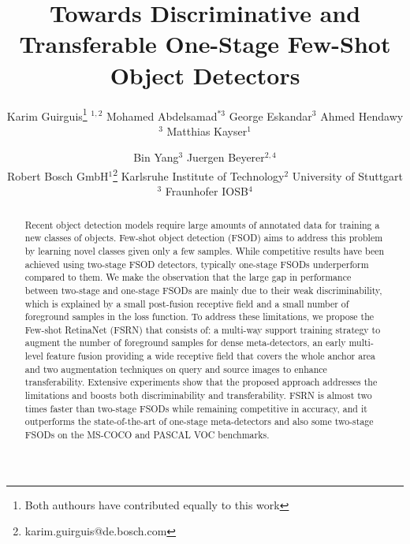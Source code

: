 \documentclass[10pt,twocolumn,letterpaper]{article}
\begin{document}
\title{Towards Discriminative and Transferable One-Stage Few-Shot Object Detectors\vspace{-1em}}





\author{
Karim Guirguis\thanks{Both authours have contributed equally to this work} $^{ 1,2}$\hspace{1mm}
Mohamed Abdelsamad$^{*3}$\hspace{1mm}
George Eskandar$^{3}$\hspace{1mm}
Ahmed Hendawy$^{3}$\hspace{1mm}
Matthias Kayser$^{1}$\\ \vspace{-5mm}
\and 
Bin Yang$^{3}$ \hspace{1mm}
Juergen Beyerer$^{2,4}$\\ 
{\normalsize Robert Bosch GmbH$^1$\thanks{karim.guirguis@de.bosch.com}}\hspace{1mm}
{\normalsize Karlsruhe Institute of Technology$^2$}
{\normalsize University of Stuttgart$^3$}
{\normalsize Fraunhofer IOSB$^4$}
\vspace{-2em}
}


\clearpage 
\maketitle

\thispagestyle{empty}

\begin{abstract}
\vspace{-1em}
Recent object detection models require large amounts of annotated data for training a new classes of objects. Few-shot object detection (FSOD) aims to address this problem by learning novel classes given only a few samples. While competitive results have been achieved using two-stage FSOD detectors, typically one-stage FSODs underperform compared to them. We make the observation that the large gap in performance between two-stage and one-stage FSODs are mainly due to their weak discriminability, which is explained by a small post-fusion receptive field and a small number of foreground samples in the loss function. To address these limitations, we propose the Few-shot RetinaNet (FSRN) that consists of: a multi-way support training strategy to augment the number of foreground samples for dense meta-detectors, an early multi-level feature fusion providing a wide receptive field that covers the whole anchor area and two augmentation techniques on query and source images to enhance transferability. Extensive experiments show that the proposed approach addresses the limitations and boosts both discriminability and transferability. FSRN is almost two times faster than two-stage FSODs while remaining competitive in accuracy, and it outperforms the state-of-the-art of one-stage meta-detectors and also some two-stage FSODs on the MS-COCO and PASCAL VOC benchmarks.
\end{abstract}
\vspace{-2em}
\end{document}
